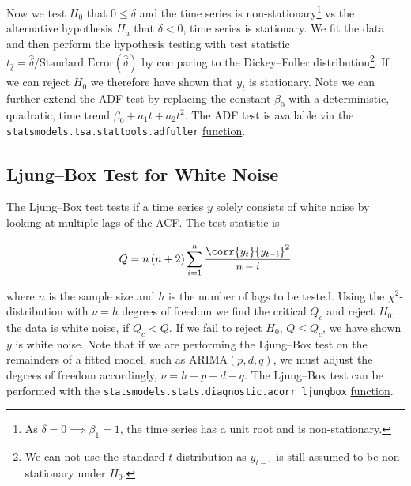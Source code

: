 Now we test $H_{0}$ that $0 \leq \delta$ and the time series is
non-stationary\footnote{As $\delta = 0 \implies \beta_{1} = 1$, \ie the time series has a unit root and is non-stationary.}
vs the alternative hypothesis $H_{a}$ that $\delta < 0$, \ie time series is stationary.
We fit the data and then perform the hypothesis testing with test statistic
$t_{\hat{\delta}} = \hat{\delta} / \text{Standard Error}\left(\hat{\delta}\right)$
by comparing to the Dickey--Fuller distribution\footnote{We can not use the standard $t$-distribution as $y_{t-1}$ is still assumed to be non-stationary under $H_{0}$.}.
If we can reject $H_{0}$ we therefore have shown that $y_{t}$ is stationary.
Note we can further extend the ADF test by replacing the constant $\beta_{0}$
with a deterministic, quadratic, time trend $\beta_{0} + a_{1} t + a_{2} t^{2}$.
The ADF test is available via the \texttt{statsmodels.tsa.stattools.adfuller}
\href{https://www.statsmodels.org/dev/generated/statsmodels.tsa.stattools.adfuller.html}{function}.

\subsection{Ljung--Box Test for White Noise}
\label{additional:time_series:ljung_box}

The Ljung--Box test tests if a time series $y$ solely consists of white noise
by looking at multiple lags of the ACF.
The test statistic is

\begin{equation}\label{eq:time_series:ljung_box:Q}
Q = n \left(n+2\right) \sum_{i=1}^{h} \frac{\corr{y_{t}}{y_{t-i}}^{2}}{n-i}
\end{equation}

\noindent where $n$ is the sample size and $h$ is the number of lags to be tested.
Using the $\chi^{2}$-distribution with $\nu = h$ degrees of freedom we find the critical $Q_{c}$
and reject $H_{0}$, the data is white noise, if $Q_{c} < Q$.
If we fail to reject $H_{0}$, \ie $Q \leq Q_{c}$, we have shown $y$ is white noise.
Note that if we are performing the Ljung--Box test on the remainders of a fitted model, such as ARIMA$\left(p,d,q\right)$,
we must adjust the degrees of freedom accordingly, $\nu = h - p - d - q$.
The Ljung--Box test can be performed with the \texttt{statsmodels.stats.diagnostic.acorr\_ljungbox}
\href{https://www.statsmodels.org/dev/generated/statsmodels.stats.diagnostic.acorr_ljungbox.html}{function}.
